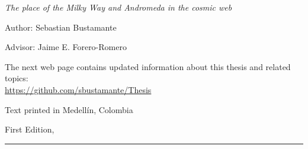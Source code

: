 
\thispagestyle{empty}

\hfill

\vfill

\medskip


\noindent
\textit{
The place of the Milky Way and Andromeda in the cosmic web
}




Author: Sebastian Bustamante

Advisor: Jaime E. Forero-Romero



\vfill

\vfill

\noindent
The next web page contains updated information about this thesis and related topics: \\
\url{https://github.com/sbustamante/Thesis}


\noindent
Text printed in Medellín, Colombia

\noindent
First Edition, 
\monthname \ \the\year

\vspace{1cm}
\hrule
\bigskip

\cleardoublepage

%
%
%
%
%
%

